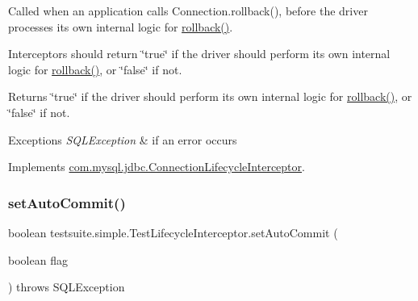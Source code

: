 Called when an application calls Connection.\+rollback(), before the driver processes its own internal logic for \mbox{\hyperlink{classtestsuite_1_1simple_1_1_test_lifecycle_interceptor_a7cdeb42f7891e22dadce89627befbcdf}{rollback()}}.

Interceptors should return \char`\"{}true\char`\"{} if the driver should perform its own internal logic for \mbox{\hyperlink{classtestsuite_1_1simple_1_1_test_lifecycle_interceptor_a7cdeb42f7891e22dadce89627befbcdf}{rollback()}}, or \char`\"{}false\char`\"{} if not.

\begin{DoxyReturn}{Returns}
\char`\"{}true\char`\"{} if the driver should perform its own internal logic for \mbox{\hyperlink{classtestsuite_1_1simple_1_1_test_lifecycle_interceptor_a7cdeb42f7891e22dadce89627befbcdf}{rollback()}}, or \char`\"{}false\char`\"{} if not.
\end{DoxyReturn}

\begin{DoxyExceptions}{Exceptions}
{\em S\+Q\+L\+Exception} & if an error occurs \\
\hline
\end{DoxyExceptions}


Implements \mbox{\hyperlink{interfacecom_1_1mysql_1_1jdbc_1_1_connection_lifecycle_interceptor_ad7d4ade6867189eceeaad2c062aff0ee}{com.\+mysql.\+jdbc.\+Connection\+Lifecycle\+Interceptor}}.

\mbox{\label{classtestsuite_1_1simple_1_1_test_lifecycle_interceptor_a98376ea207527feed3bc76d491c98cc2}} 
\subsubsection{\texorpdfstring{set\+Auto\+Commit()}{setAutoCommit()}}
{\footnotesize\ttfamily boolean testsuite.\+simple.\+Test\+Lifecycle\+Interceptor.\+set\+Auto\+Commit (\begin{DoxyParamCaption}\item[{boolean}]{flag }\end{DoxyParamCaption}) throws S\+Q\+L\+Exception}

